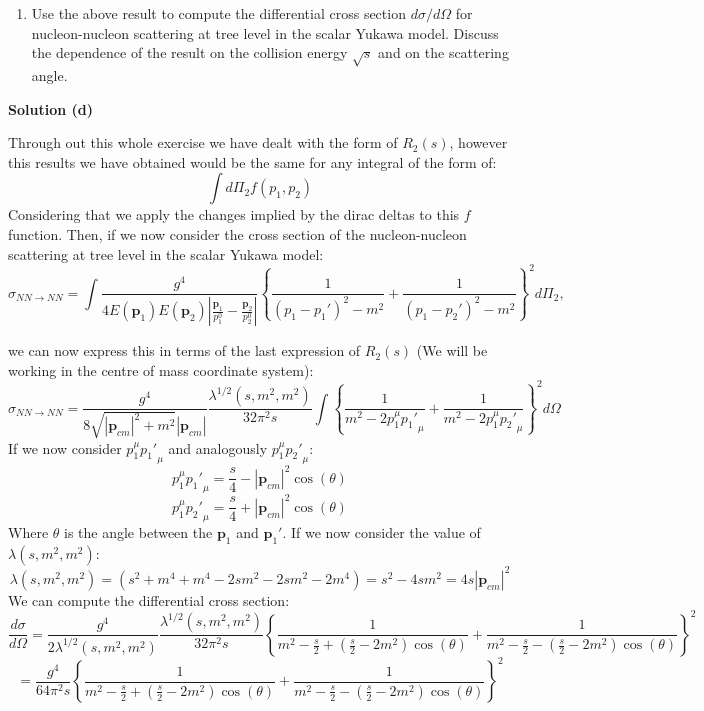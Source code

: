 \documentclass[12pt]{article}
\begin{document}
\color{black}

\begin{enumerate}[label=(\alph*), start = 4]
    \item Use the above result to compute the differential cross section $d\sigma/d\Omega$ for nucleon-nucleon scattering at tree level in the scalar Yukawa model. Discuss the dependence of the result on the collision energy $\sqrt{s}$ and on the scattering angle.
\end{enumerate}

\color{blue}

\textbf{Solution (d)}

Through out this whole exercise we have dealt with the form of $R_2(s)$, however this results we have obtained would be the same for any integral of the form of:
\[
    \int d\Pi_2 f(p_1,p_2)
\]
Considering that we apply the changes implied by the dirac deltas to this $f$ function. Then, if we now consider the cross section of the nucleon-nucleon scattering at tree level in the scalar Yukawa model:
\[
    \sigma_{NN\rightarrow NN} = \int \frac{g^4}{4E(\mathbf{p}_1)E(\mathbf{p}_2)|\frac{\mathbf{p}_1}{p_1^0}-\frac{\mathbf{p}_2}{p_2^0}|}\left\{\frac{1}{(p_1-p_1')^2-m^2}+\frac{1}{(p_1-p_2')^2-m^2}\right\}^2d\Pi_2,
\]

we can now express this in terms of the last expression of $R_2(s)$ (We will be working in the centre of mass coordinate system):
\[
        \sigma_{NN\rightarrow NN} = \frac{g^4}{8\sqrt{|\mathbf{p}_{cm}|^2 + m^2}|\mathbf{p}_{cm}|}\frac{\lambda^{1/2}(s,m^2,m^2)}{32\pi^2 s}\int \left\{\frac{1}{m^2-2p_1^\mu{p_1'}_\mu}+\frac{1}{m^2-2p_1^\mu{p_2'}_\mu}\right\}^2 d\Omega 
\]
If we now consider $p_1^\mu{p_1'}_\mu$ and analogously $p_1^\mu{p_2'}_\mu$:
\[
    p_1^\mu{p_1'}_\mu = \frac{s}{4} - |\mathbf{p}_{cm}|^2\cos(\theta)
\]
\[
    p_1^\mu{p_2'}_\mu = \frac{s}{4} + |\mathbf{p}_{cm}|^2\cos(\theta)
\]
Where $\theta$ is the angle between the $\mathbf{p}_1$ and $\mathbf{p}_1'$. If we now consider the value of $\lambda(s,m^2,m^2)$:
\[
    \lambda(s,m^2,m^2) = \left(s^2 + m^4 + m^4 - 2sm^2 - 2sm^2 - 2m^4\right) = s^2 -4sm^2 = 4s|\mathbf{p}_{cm}|^2
\]
We can compute the differential cross section:
\[
    \frac{d\sigma}{d\Omega}= \frac{g^4}{2\lambda^{1/2}(s,m^2,m^2)}\frac{\lambda^{1/2}(s,m^2,m^2)}{32\pi^2 s}\left\{\frac{1}{m^2-\frac{s}{2}+(\frac{s}{2}-2m^2)\cos(\theta)}+\frac{1}{m^2-\frac{s}{2}-(\frac{s}{2}-2m^2)\cos(\theta)}\right\}^2
\]
\[
    =\frac{g^4}{64\pi^2 s}\left\{\frac{1}{m^2-\frac{s}{2}+(\frac{s}{2}-2m^2)\cos(\theta)}+\frac{1}{m^2-\frac{s}{2}-(\frac{s}{2}-2m^2)\cos(\theta)}\right\}^2
\]
\end{document}
